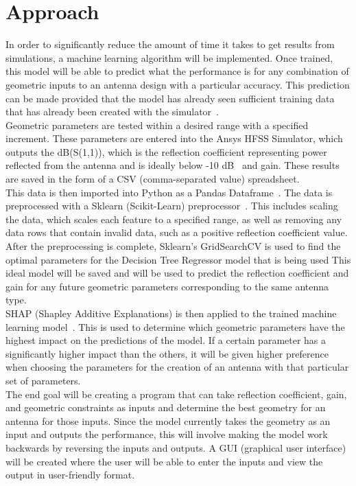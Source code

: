\documentclass[12pt, letterpaper, notitlepage]{article}
\begin{document}
\section*{Approach}
In order to significantly reduce the amount of time it takes to get results from simulations, a machine learning algorithm will be implemented. Once trained, this model will be able to predict what the performance is for any combination of geometric inputs to an antenna design with a particular accuracy. This prediction can be made provided that the model has already seen sufficient training data that has already been created with the simulator~\cite{Naseri_2021}.\\
Geometric parameters are tested within a desired range with a specified increment. These parameters are entered into the Ansys HFSS Simulator, which outputs the dB(S(1,1)), which is the reflection coefficient representing power reflected from the antenna and is ideally below -10 dB~\cite{Bevelacqua_2015} and gain. These results are saved in the form of a CSV (comma-separated value) spreadsheet.\\
This data is then imported into Python as a Pandas Dataframe~\cite{reback2020pandas}. The data is preprocessed with a Sklearn (Scikit-Learn) preprocessor~\cite{scikit-learn}. This includes scaling the data, which scales each feature to a specified range, as well as removing any data rows that contain invalid data, such as a positive reflection coefficient value.\\
After the preprocessing is complete, Sklearn's GridSearchCV is used to find the optimal parameters for the Decision Tree Regressor model that is being used This ideal model will be saved and will be used to predict the reflection coefficient and gain for any future geometric parameters corresponding to the same antenna type.\\
SHAP (Shapley Additive Explanations) is then applied to the trained machine learning model~\cite{lundberg2017unified}. This is used to determine which geometric parameters have the highest impact on the predictions of the model. If a certain parameter has a significantly higher impact than the others, it will be given higher preference when choosing the parameters for the creation of an antenna with that particular set of parameters.\\
The end goal will be creating a program that can take reflection coefficient, gain, and geometric constraints as inputs and determine the best geometry for an antenna for those inputs. Since the model currently takes the geometry as an input and outputs the performance, this will involve making the model work backwards by reversing the inputs and outputs. A GUI (graphical user interface) will be created where the user will be able to enter the inputs and view the output in user-friendly format. 
\end{document}
